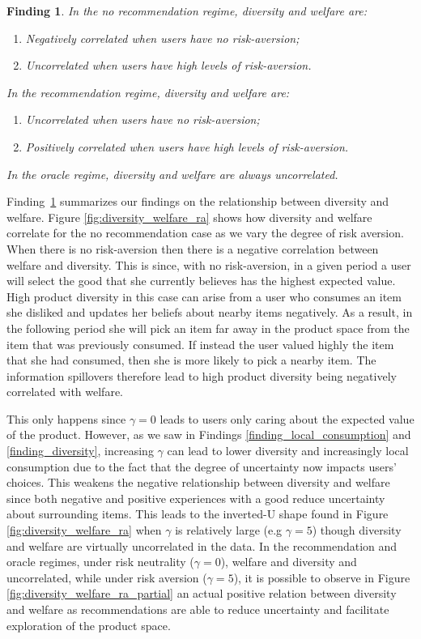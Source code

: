 \documentclass[format=acmsmall, review=false]{acmart}
\newtheorem{finding}{Finding}
\begin{document}
\begin{finding}\label{finding_diversity_welfare_corr}
In the no recommendation regime, diversity and welfare are:
\begin{enumerate}
\item Negatively correlated when users have no risk-aversion;
\item Uncorrelated when users have high levels of risk-aversion.
\end{enumerate}
In the recommendation regime, diversity and welfare are:
\begin{enumerate}
\item Uncorrelated when users have no risk-aversion;
\item Positively correlated when users have high levels of risk-aversion.
\end{enumerate}
In the oracle regime, diversity and welfare are always uncorrelated.
\end{finding}

Finding~\ref{finding_diversity_welfare_corr} summarizes our findings on the relationship between diversity and welfare. Figure \ref{fig:diversity_welfare_ra} shows how diversity and welfare correlate for the no recommendation case as we vary the degree of risk aversion. When there is no risk-aversion then there is a negative correlation between welfare and diversity. This is since, with no risk-aversion, in a given period a user will select the good that she currently believes has the highest expected value. High product diversity in this case can arise from a user who consumes an item she disliked and updates her beliefs about nearby items negatively. As a result, in the following period she will pick an item far away in the product space from the item that was previously consumed. If instead the user valued highly the item that she had consumed, then she is more likely to pick a nearby item. The information spillovers therefore lead to high product diversity being negatively correlated with welfare.
\par
This only happens since $\gamma = 0$ leads to users only caring about the expected value of the product. However, as we saw in Findings \ref{finding_local_consumption} and \ref{finding_diversity}, increasing $\gamma$ can lead to lower diversity and increasingly local consumption due to the fact that the degree of uncertainty now impacts users' choices. This weakens the negative relationship between diversity and welfare since both negative and positive experiences with a good reduce uncertainty about surrounding items. This leads to the inverted-U shape found in Figure \ref{fig:diversity_welfare_ra} when $\gamma$ is relatively large (e.g $\gamma = 5$) though diversity and welfare are virtually uncorrelated in the data. In the recommendation and oracle regimes, under risk neutrality ($\gamma=0$), welfare and diversity and uncorrelated, while under risk aversion ($\gamma=5$), it is possible to observe in Figure \ref{fig:diversity_welfare_ra_partial} an actual positive relation between diversity and welfare as recommendations are able to reduce uncertainty and facilitate exploration of the product space.
\end{document}
